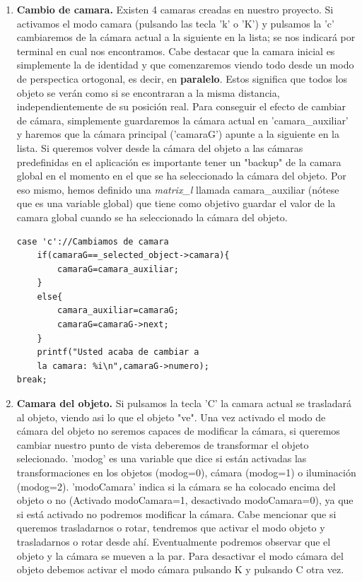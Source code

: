 \documentclass[12pt,a4paper]{article}
\begin{document}
\begin{enumerate}
\begin{enumerate}
\item \textbf{Cambio de camara.}
Existen 4 camaras creadas en nuestro proyecto. Si activamos el modo camara (pulsando las tecla 'k' o 'K') y pulsamos la 'c' cambiaremos de la cámara actual a la siguiente en la lista; se nos indicará por terminal en cual nos encontramos.\newline
Cabe destacar que la camara inicial es simplemente la de identidad y que comenzaremos viendo todo desde un modo de perspectica ortogonal, es decir, en \textbf{paralelo}. Estos significa que todos los objeto se verán como si se encontraran a la misma distancia, independientemente de su posición real.\newline
Para conseguir el efecto de cambiar de cámara, simplemente guardaremos la cámara actual en 'camara\_auxiliar' y haremos que la cámara principal ('camaraG') apunte a la siguiente en la lista.
Si queremos volver desde la cámara del objeto a las cámaras predefinidas en el aplicación es importante tener un "backup" de la camara global en el momento en el que se ha seleccionado la cámara del objeto. Por eso mismo, hemos definido una \textit{matrix\_l} llamada camara\_auxiliar (nótese que es una variable global) que tiene como objetivo guardar el valor de la camara global cuando se ha seleccionado la cámara del objeto.
\begin{lstlisting}
case 'c'://Cambiamos de camara
	if(camaraG==_selected_object->camara){
		camaraG=camara_auxiliar;
	}     
	else{
		camara_auxiliar=camaraG;
		camaraG=camaraG->next;
	}
    printf("Usted acaba de cambiar a 
    la camara: %i\n",camaraG->numero);
break;
\end{lstlisting}


\item \textbf{Camara del objeto.}
Si pulsamos la tecla 'C' la camara actual se trasladará al objeto, viendo asi lo que el objeto "ve". Una vez activado el modo de cámara del objeto no seremos capaces de modificar la cámara, si queremos cambiar nuestro punto de vista deberemos de transformar el objeto selecionado.\newline
'modog' es una variable que dice si están activadas las transformaciones en los objetos (modog=0), cámara (modog=1) o iluminación (modog=2). 'modoCamara' indica si la cámara se ha colocado encima del objeto o no (Activado modoCamara=1, desactivado modoCamara=0), ya que si está activado no podremos modificar la cámara.\newline
Cabe mencionar que si queremos trasladarnos o rotar, tendremos que activar el modo objeto y trasladarnos o rotar desde ahí.
Eventualmente podremos observar que el objeto y la cámara se mueven a la par. Para desactivar el modo cámara del objeto debemos activar el modo cámara pulsando K y pulsando C otra vez.


\end{enumerate}
\end{enumerate}
\end{document}
